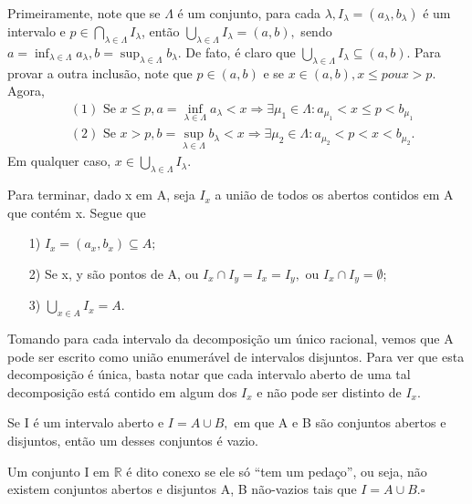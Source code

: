 \documentclass[Analysis/analysis_notes.tex]{subfiles}
\begin{document}
\begin{proof*}
	Primeiramente, note que se $\Lambda $ \'e um conjunto, para cada $\lambda, I_{\lambda }=(a_{\lambda }, b_{\lambda })$ \'e um intervalo
	e $p\in\bigcap_{\lambda \in\Lambda }^{}{I_{\lambda }}$, ent\~ao $\bigcup_{\lambda \in\Lambda }^{}{I_{\lambda }}=(a, b),$ sendo
	$a = \inf_{\lambda \in\Lambda }a_{\lambda }, b = \sup_{\lambda \in\Lambda }b_{\lambda }.$ De fato, \'e claro que $\bigcup_{\lambda \in\Lambda }^{}{I_{\lambda }}\subseteq{(a, b)}$.
	Para provar a outra inclus\~ao, note que $p\in(a, b)$ e se $x\in(a, b), x\leq p ou x > p.$ Agora,
	\begin{align*}
		 & (1) \text{ Se }  x\leq p, a = \inf_{\lambda \in\Lambda }a_{\lambda } < x \Rightarrow \exists \mu_{1}\in\Lambda: a_{\mu_{1}}<x\leq p < b_{\mu_{1}} \\
		 & (2) \text{ Se } x > p, b=\sup_{\lambda \in\Lambda }b_{\lambda } < x \Rightarrow \exists \mu_{2}\in\Lambda: a_{\mu_{2}} < p < x < b_{\mu_{2}}.
	\end{align*}
	Em qualquer caso,  $x\in \bigcup_{\lambda \in\Lambda }^{}{I_{\lambda }}.$

	Para terminar, dado x em A, seja $I_{x}$ a uni\~ao de todos os abertos contidos em A que cont\'em x. Segue que
	\begin{itemize}
		\item[1)] $I_{x} = (a_{x}, b_{x})\subseteq{A};$
		\item[2)] Se x, y s\~ao pontos de A, ou $I_{x}\cap I_{y}=I_{x} = I_{y},$ ou $I_{x}\cap I_{y} = \emptyset$;
		\item[3)] $\bigcup_{x\in A}^{}{I_{x}} = A.$
	\end{itemize}
	Tomando para cada intervalo da decomposi\c c\~ao um \'unico racional, vemos que A pode ser escrito como uni\~ao enumer\'avel de
	intervalos disjuntos. Para ver que esta decomposi\c c\~ao \'e \'unica, basta notar que cada intervalo aberto de uma tal decomposi\c c\~ao
	est\'a contido em algum dos $I_{x}$ e n\~ao pode ser distinto de $I_{x}.$ \qedsymbol
\end{proof*}
\begin{crl*}
	Se I \'e um intervalo aberto e $I = A\cup B,$ em que A e B s\~ao conjuntos abertos e disjuntos, ent\~ao um desses conjuntos \'e vazio.
\end{crl*}
\begin{def*}
	Um conjunto I em $\mathbb{R}$ \'e dito conexo se ele s\'o ``tem um peda\c co'', ou seja, n\~ao existem conjuntos abertos e disjuntos A, B
	n\~ao-vazios tais que $I = A\cup{B}.\square$
\end{def*}
\end{document}
